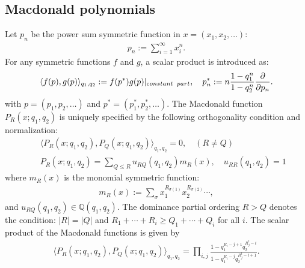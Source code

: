 \documentclass[hyper,letterpaper]{JHEP3}
\begin{document}
\subsection{Macdonald polynomials}
\label{sec:macdonald}
Let $p_n$ be the power sum
symmetric function in $x=(x_1,x_2,\ldots)$:
\begin{eqnarray}
p_n:=\sum_{i=1}^{\infty}x_i^n.
\end{eqnarray}
For any symmetric functions $f$ and $g$, a scalar product is
introduced as:
\begin{eqnarray}
\langle f(p),g(p)\rangle_{q_1,q_2}:=f(p^*)g(p)|_{\text constant\;\;part},
\quad p_n^*:=n\frac{1-q_1^n}{1-q_2^n}\frac{\partial}{\partial p_n}.
\end{eqnarray}
with $p=(p_1,p_2, \ldots )$ and $p^* = (p_1^*, p_2^*, \ldots )$.
The Macdonald function $P_R(x;q_1,q_2)$ is uniquely specified by the
following orthogonality condition and normalization:
\begin{eqnarray}
&&\langle P_R(x;q_1,q_2),P_{Q}(x;q_1,q_2)\rangle_{q_1,q_2}=0, \quad (R\ne
 Q)\\
&&P_R(x;q_1,q_2)=\sum_{Q\le R}u_{RQ}(q_1,q_2)m_R(x),\quad u_{RR}(q_1,q_2)=1
\end{eqnarray}
where $m_R(x)$ is the monomial symmetric function:
\begin{eqnarray}
m_R(x):=\sum_{\sigma}x_1^{R_{\sigma(1)}}x_2^{R_{\sigma(2)}}\cdots,
\end{eqnarray}
and $u_{RQ}(q_1,q_2)\in\mathbb{Q}(q_1,q_2)$.
The dominance partial ordering $R>Q$ denotes the condition: $|R|=|Q|$
and $R_1+\cdots +R_i\ge Q_1+\cdots +Q_i$ for all $i$.
The scalar product of the Macdonald functions is given by
\begin{eqnarray}
\langle P_{R}(x;q_1,q_2),P_{Q}(x;q_1,q_2)\rangle_{q_1,q_2}=\prod_{i,j}
\frac{1-q_1^{R_i-j+1}q_2^{R_j^{t}-i}}{1-q_1^{R_i-j}q_2^{R_j^{t}-i+1}}.
\end{eqnarray}
\end{document}
